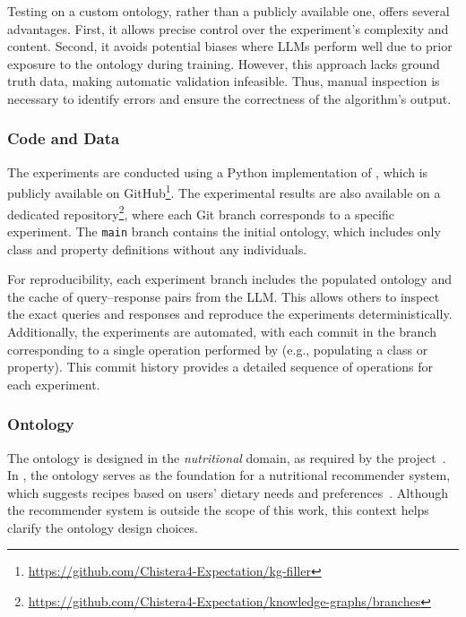 %
Testing \llmfkg{} on a custom ontology, rather than a publicly available one, offers several advantages.
%
First, it allows precise control over the experiment's complexity and content.
%
Second, it avoids potential biases where \glspl{LLM} perform well due to prior exposure to the ontology during training.
%
However, this approach lacks ground truth data, making automatic validation infeasible.
%
Thus, manual inspection is necessary to identify errors and ensure the correctness of the algorithm's output.

%
\subsubsection{Code and Data}
\label{subsubsec:code-and-data}
%
The experiments are conducted using a Python implementation of \llmfkg{}, which is publicly available on GitHub\footnote{\url{https://github.com/Chistera4-Expectation/kg-filler}}.
%
The experimental results are also available on a dedicated repository\footnote{\url{https://github.com/Chistera4-Expectation/knowledge-graphs/branches}}, where each Git branch corresponds to a specific experiment.
%
The \texttt{main} branch contains the initial ontology, which includes only class and property definitions without any individuals.

%
For reproducibility, each experiment branch includes the populated ontology and the cache of query--response pairs from the \gls{LLM}.
%
This allows others to inspect the exact queries and responses and reproduce the experiments deterministically.
%
Additionally, the experiments are automated, with each commit in the branch corresponding to a single operation performed by \llmfkg{} (e.g., populating a class or property).
%
This commit history provides a detailed sequence of operations for each experiment.

%
\subsubsection{Ontology}
\label{subsubsec:kgfiller-ontology}
%
The ontology is designed in the \emph{nutritional} domain, as required by the \expectation{} project~\cite{expectation-extraamas2021}.
%
In \expectation{}, the ontology serves as the foundation for a nutritional recommender system, which suggests recipes based on users' dietary needs and preferences~\cite{DBLP:journals/cmpb/MagniniCCAO23}.
%
Although the recommender system is outside the scope of this work, this context helps clarify the ontology design choices.

